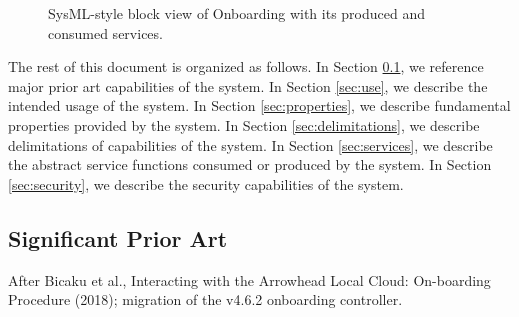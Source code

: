 \documentclass[a4paper]{arrowhead}
\begin{document}
\begin{figure}[ht!]
  \centering
  \caption{SysML-style block view of Onboarding with its produced and consumed services.}
  \label{fig:system}
\end{figure}

The rest of this document is organized as follows.
In Section \ref{sec:prior_art}, we reference major prior art capabilities of the system.
In Section \ref{sec:use}, we describe the intended usage of the system.
In Section \ref{sec:properties}, we describe fundamental properties provided by the system.
In Section \ref{sec:delimitations}, we describe delimitations of capabilities of the system.
In Section \ref{sec:services}, we describe the abstract service functions consumed or produced by the system.
In Section \ref{sec:security}, we describe the security capabilities of the system.

\newpage

\subsection{Significant Prior Art}
\label{sec:prior_art}

After Bicaku et al., Interacting with the Arrowhead Local Cloud: On-boarding Procedure (2018); migration of the v4.6.2 onboarding controller.
\end{document}
